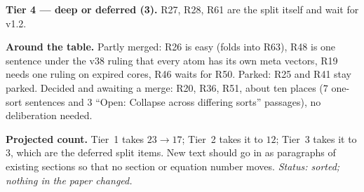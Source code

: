 \documentclass[11pt]{article}
\begin{document}
\textbf{Tier 4 --- deep or deferred (3).} R27, R28, R61 are the split itself and wait for v1.2.

\textbf{Around the table.} Partly merged: R26 is easy (folds into R63), R48 is one sentence under the v38 ruling that every atom has its own meta vectors, R19 needs one ruling on expired
cores, R46 waits for R50. Parked: R25 and R41 stay parked. Decided and awaiting a merge: R20, R36, R51, about ten places ($7$ one-sort sentences and $3$ ``Open: Collapse across differing sorts''
passages), no deliberation needed.

\textbf{Projected count.} Tier~1 takes $23\to17$; Tier~2 takes it to $12$; Tier~3 takes it to $3$, which are the deferred split items.
New text should go in as paragraphs of existing sections so that no section or equation number moves.
\emph{Status: sorted; nothing in the paper changed.}
\end{document}
